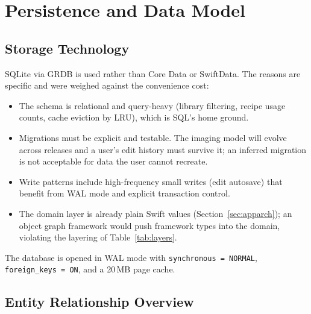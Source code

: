 \section{Persistence and Data Model}
\label{sec:schema}

\subsection{Storage Technology}

SQLite via GRDB is used rather than Core Data or SwiftData. The reasons are
specific and were weighed against the convenience cost:

\begin{itemize}
\item The schema is relational and query-heavy (library filtering, recipe
usage counts, cache eviction by LRU), which is SQL's home ground.
\item Migrations must be explicit and testable. The imaging model will evolve
across releases and a user's edit history must survive it; an inferred
migration is not acceptable for data the user cannot recreate.
\item Write patterns include high-frequency small writes (edit autosave) that
benefit from WAL mode and explicit transaction control.
\item The domain layer is already plain Swift values
(Section~\ref{sec:apparch}); an object graph framework would push framework
types into the domain, violating the layering of Table~\ref{tab:layers}.
\end{itemize}

The database is opened in WAL mode \cite{sqlitewal} with
\texttt{synchronous = NORMAL},
\texttt{foreign\_keys = ON}, and a 20\,MB page cache.

\subsection{Entity Relationship Overview}

